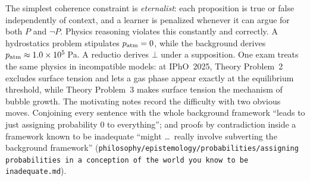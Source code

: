 The simplest coherence constraint is \emph{eternalist}: each proposition is true or
false independently of context, and a learner is penalized whenever it can argue for
both $P$ and $\neg P$. Physics reasoning violates this constantly and correctly. A
hydrostatics problem stipulates $p_{\rm atm}=0$, while the background derives
$p_{\rm atm}\approx1.0\times10^5$\,Pa. A reductio derives $\bot$ under a supposition.
One exam treats the same physics in incompatible models: at IPhO~2025, Theory Problem~2
excludes surface tension and lets a gas phase appear exactly at the equilibrium
threshold, while Theory Problem~3 makes surface tension the mechanism of bubble growth.
The motivating notes record the difficulty with two obvious moves. Conjoining every
sentence with the whole background framework ``leads to just assigning probability $0$
to everything''; and proofs by contradiction inside a framework known to be inadequate
``might \dots\ really involve subverting the background framework''
(\texttt{philosophy/epistemology/probabilities/assigning probabilities in a conception of
the world you know to be inadequate.md}).

